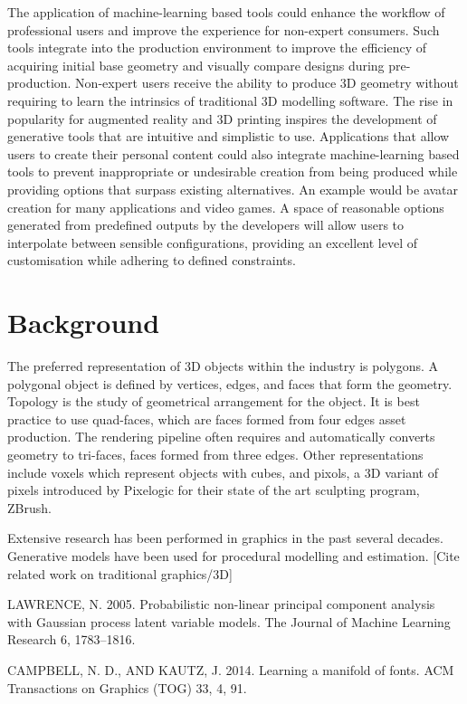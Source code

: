 \documentclass[a4paper, fontsize=15pt, onecolumn]{article} %
\numberwithin{equation}{section} %
\numberwithin{figure}{section} %
\numberwithin{table}{section} %
\begin{document}
The application of machine-learning based tools could enhance the workflow of professional users and improve the experience for non-expert consumers. Such tools integrate into the production environment to improve the efficiency of acquiring initial base geometry and visually compare designs during pre-production. Non-expert users receive the ability to produce 3D geometry without requiring to learn the intrinsics of traditional 3D modelling software. The rise in popularity for augmented reality and 3D printing inspires the development of generative tools that are intuitive and simplistic to use. Applications that allow users to create their personal content could also integrate machine-learning based tools to prevent inappropriate or undesirable creation from being produced while providing options that surpass existing alternatives. An example would be avatar creation for many applications and video games. A space of reasonable options generated from predefined outputs by the developers will allow users to interpolate between sensible configurations, providing an excellent level of customisation while adhering to defined constraints.

\section{Background}
The preferred representation of 3D objects within the industry is polygons. A polygonal object is defined by vertices, edges, and faces that form the geometry. Topology is the study of geometrical arrangement for the object. It is best practice to use quad-faces, which are faces formed from four edges asset production. The rendering pipeline often requires and automatically converts geometry to tri-faces, faces formed from three edges. Other representations include voxels which represent objects with cubes, and pixols, a 3D variant of pixels introduced by Pixelogic for their state of the art sculpting program, ZBrush.

Extensive research has been performed in graphics in the past several decades. Generative models have been used for procedural modelling and estimation.
[Cite related work on traditional graphics/3D]

LAWRENCE, N. 2005. Probabilistic non-linear principal component analysis with Gaussian process latent variable models. The Journal of Machine Learning Research 6, 1783–1816. 

CAMPBELL, N. D., AND KAUTZ, J. 2014. Learning a manifold of fonts. ACM Transactions on Graphics (TOG) 33, 4, 91. 
\end{document}
